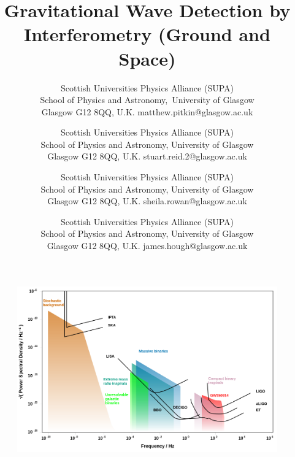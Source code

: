 \documentclass{article}
\begin{document}
\title{Gravitational Wave Detection by Interferometry (Ground and Space)
}

\author{%
        {Scottish Universities Physics Alliance (SUPA)\\
        School of Physics and Astronomy,\
        University of Glasgow \\
        Glasgow G12 8QQ, U.K.}
        {matthew.pitkin@glasgow.ac.uk}
        {}
\and
{}
        {Scottish Universities Physics Alliance (SUPA)\\
        School of Physics and Astronomy,
        University of Glasgow \\
        Glasgow G12 8QQ, U.K.}
        {stuart.reid.2@glasgow.ac.uk}
    {}
\and
{}
        {Scottish Universities Physics Alliance (SUPA)\\
        School of Physics and Astronomy,
        University of Glasgow \\
        Glasgow G12 8QQ, U.K.}
        {sheila.rowan@glasgow.ac.uk}
        {}
\and
{}
        {Scottish Universities Physics Alliance (SUPA)\\
        School of Physics and Astronomy,
        University of Glasgow \\
        Glasgow G12 8QQ, U.K.}
        {james.hough@glasgow.ac.uk}
        {}
}

\date{}
\maketitle

\begin{abstract}\end{abstract}



\begin{figure}[]
\begin{center}
\includegraphics[width=1\columnwidth]{./figures/fig1/fig1}
\caption{ \protect}
\end{center}
\end{figure}
\end{document}
